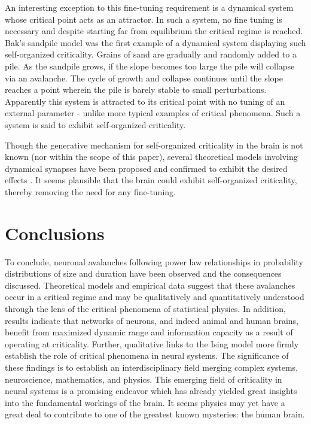 \documentclass[12pt]{article}
\begin{document}
An interesting exception to this fine-tuning requirement is a dynamical system whose critical point acts as an attractor. In such a system, no fine tuning is necessary and despite starting far from equilibrium the critical regime is reached. Bak's sandpile model\cite{Bak1987a} was the first example of a dynamical system displaying such self-organized criticality. Grains of sand are gradually and randomly added to a pile. As the sandpile grows, if the slope becomes too large the pile will collapse via an avalanche. The cycle of growth and collapse continues until the slope reaches a point wherein the pile is barely stable to small perturbations. Apparently this system is attracted to its critical point with no tuning of an external parameter - unlike more typical examples of critical phenomena. Such a system is said to exhibit self-organized criticality.
   
Though the generative mechanism for self-organized criticality in the brain is not known (nor within the scope of this paper), several theoretical models involving dynamical synapses have been proposed and confirmed to exhibit the desired effects \cite{Levina2007a, Levina2009a, Bornholdt2003a, Rybarsch2014a}. It seems plausible that the brain could exhibit self-organized criticality, thereby removing the need for any fine-tuning.

\section*{Conclusions}

To conclude, neuronal avalanches following power law relationships in probability distributions of size and duration have been observed and the consequences discussed. Theoretical models and empirical data suggest that these avalanches occur in a critical regime and may be qualitatively and quantitatively understood through the lens of the critical phenomena of statistical physics. In addition, results indicate that networks of neurons, and indeed animal and human brains, benefit from maximized dynamic range and information capacity as a result of operating at criticality. Further, qualitative links to the Ising model more firmly establish the role of critical phenomena in neural systems. The significance of these findings is to establish an interdisciplinary field merging complex systems, neuroscience, mathematics, and physics. This emerging field of criticality in neural systems is a promising endeavor which has already yielded great insights into the fundamental workings of the brain. It seems physics may yet have a great deal to contribute to one of the greatest known mysteries: the human brain. 



{\small
}
\end{document}

